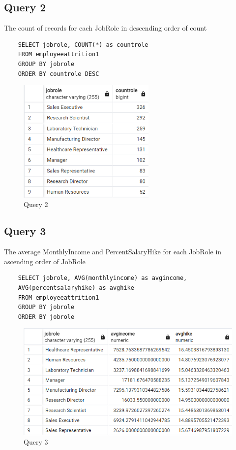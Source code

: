 \documentclass[12pt]{article}
\begin{document}
\subsection{Query 2}
The count of records for each JobRole in descending order of count
\begin{verbatim}
    SELECT jobrole, COUNT(*) as countrole
    FROM employeeattrition1
    GROUP BY jobrole
    ORDER BY countrole DESC
\end{verbatim}

\begin{figure}[H]
    \centering
    \includegraphics[width=0.6\textwidth]{images/query2.png}
    \caption{Query 2}
    \label{fig:query2}
\end{figure}

\subsection{Query 3}
The average MonthlyIncome and PercentSalaryHike for each JobRole in ascending
order of JobRole
\begin{verbatim}
    SELECT jobrole, AVG(monthlyincome) as avgincome,
    AVG(percentsalaryhike) as avghike
    FROM employeeattrition1
    GROUP BY jobrole
    ORDER BY jobrole
\end{verbatim}

\begin{figure}[H]
    \centering
    \includegraphics[width=1\textwidth]{images/query3.png}
    \caption{Query 3}
    \label{fig:query3}
\end{figure}
\end{document}
